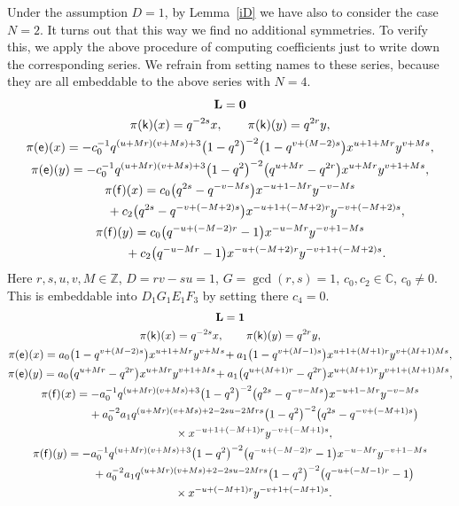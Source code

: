 \documentclass[pdftex]{sigma}
\numberwithin{equation}{section}
\begin{document}
Under the assumption $D=1$, by Lemma~\ref{iD} we have also to consider the case $N=2$. It turns out that this way we find no additional symmetries. To verify this, we apply the above procedure of computing coefficients just to write down the corresponding series. We refrain from setting names to these series, because they are all embeddable to the above series with $N=4$.
\begin{gather*}
\mathbf{L}=\mathbf{0}\\
\pi(\mathsf{k})(x)= q^{-2s}x ,\qquad\pi(\mathsf{k})(y)=q^{2r}y,\\
\pi(\mathsf{e})(x)= -c_0^{-1}q^{(u+Mr)(v+Ms)+3}\big(1-q^2\big)^{-2}\big(1-q^{v+(M-2)s}\big)x^{u+1+Mr}y^{v+Ms},\\
\pi(\mathsf{e})(y)= -c_0^{-1}q^{(u+Mr)(v+Ms)+3}\big(1-q^2\big)^{-2}\big(q^{u+Mr}-q^{2r}\big)x^{u+Mr}y^{v+1+Ms},\\
\pi(\mathsf{f})(x)= c_0\big(q^{2s}-q^{-v-Ms}\big)x^{-u+1-Mr}y^{-v-Ms}\\
\hphantom{\pi(\mathsf{f})(x)=}{} + c_2\big(q^{2s}-q^{-v+(-M+2)s}\big)x^{-u+1+(-M+2)r}y^{-v+(-M+2)s},\\
\pi(\mathsf{f})(y)= c_0\big(q^{-u+(-M-2)r}-1\big)x^{-u-Mr}y^{-v+1-Ms}\\
\hphantom{\pi(\mathsf{f})(y)=}{}+ c_2\big(q^{-u-Mr}-1\big)x^{-u+(-M+2)r}y^{-v+1+(-M+2)s}.
\end{gather*}
Here $r,s,u,v,M\in\mathbb{Z}$, $D=rv-su=1$, $G=\operatorname{gcd}(r,s)=1$, $c_0,c_2\in\mathbb{C}$, $c_0\ne 0$. This is embeddable into $D_1G_1E_1F_3$ by setting there $c_4=0$.
\begin{gather*}
 \mathbf{L}=\mathbf{1}\\
 \pi(\mathsf{k})(x)= q^{-2s}x ,\qquad\pi(\mathsf{k})(y)=q^{2r}y ,\\
\pi(\mathsf{e})(x)= a_0\big(1-q^{v+(M-2)s}\big)x^{u+1+Mr}y^{v+Ms}\!+ a_1\big(1-q^{v+(M-1)s}\big)x^{u+1+(M+1)r}y^{v+(M+1)Ms} ,\\
\pi(\mathsf{e})(y)= a_0\big(q^{u+Mr}-q^{2r}\big)x^{u+Mr}y^{v+1+Ms}\!+ a_1\big(q^{u+(M+1)r}-q^{2r}\big)x^{u+(M+1)r}y^{v+1+(M+1)Ms} ,\\
\pi(\mathsf{f})(x)= -a_0^{-1}q^{(u+Mr)(v+Ms)+3}\big(1-q^2\big)^{-2}\big(q^{2s}-q^{-v-Ms}\big)x^{-u+1-Mr}y^{-v-Ms}\\
\hphantom{\pi(\mathsf{f})(x)=}{}+ a_0^{-2}a_1q^{(u+Mr)(v+Ms)+2-2su-2Mrs}\big(1-q^2\big)^{-2}\big(q^{2s}-q^{-v+(-M+1)s}\big)\\
\hphantom{\pi(\mathsf{f})(x)=}{}\times x^{-u+1+(-M+1)r}y^{-v+(-M+1)s} ,\\
\pi(\mathsf{f})(y)= -a_0^{-1}q^{(u+Mr)(v+Ms)+3}\big(1-q^2\big)^{-2}\big(q^{-u+(-M-2)r}-1\big)x^{-u-Mr}y^{-v+1-Ms}\\
\hphantom{\pi(\mathsf{f})(y)=}{}+ a_0^{-2}a_1q^{(u+Mr)(v+Ms)+2-2su-2Mrs}\big(1-q^2\big)^{-2}\big(q^{-u+(-M-1)r}-1\big)\\
\hphantom{\pi(\mathsf{f})(y)=}{}\times x^{-u+(-M+1)r}y^{-v+1+(-M+1)s}.
\end{gather*}
\end{document}
